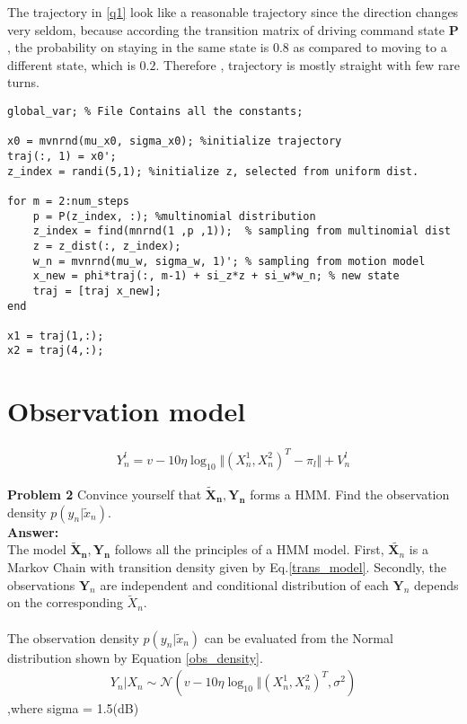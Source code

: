 \documentclass[a4paper]{article}
\begin{document}
The trajectory in \ref{q1} look like a reasonable trajectory since the direction changes very seldom, because according the transition matrix of driving command state $\mathbf{P}$, the probability on staying in the same state is $0.8$ as compared to moving to a different state, which  is $0.2$. Therefore , trajectory is mostly straight with few rare turns.\\

\begin{lstlisting}
global_var; % File Contains all the constants; 

x0 = mvnrnd(mu_x0, sigma_x0); %initialize trajectory
traj(:, 1) = x0'; 
z_index = randi(5,1); %initialize z, selected from uniform dist.

for m = 2:num_steps    
    p = P(z_index, :); %multinomial distribution
    z_index = find(mnrnd(1 ,p ,1));  % sampling from multinomial dist
    z = z_dist(:, z_index); 
    w_n = mvnrnd(mu_w, sigma_w, 1)'; % sampling from motion model 
    x_new = phi*traj(:, m-1) + si_z*z + si_w*w_n; % new state
    traj = [traj x_new];
end

x1 = traj(1,:);
x2 = traj(4,:);

\end{lstlisting}

\section*{Observation model}

\begin{eqnarray}
Y_n^l = v - 10\eta\log_{10} \Vert (X_n^1, X_n^2)^T - \pi_l \Vert + V_n^l
\end{eqnarray} \label{obs_model}

\textbf{Problem 2}
Convince yourself that $\mathbf{\tilde{X}_n, \mathbf{Y}_n}$ forms a HMM. Find the observation density $p(y_n|\tilde{x}_n)$. \\
\textbf{Answer:} \\
The model $\mathbf{\tilde{X}_n, \mathbf{Y}_n}$ follows all the principles of a HMM model. First,  $\tilde{\mathbf{X}_n}$ is a Markov Chain with transition density given by  Eq.\ref{trans_model}. Secondly, the observations $\mathbf{Y}_n$ are independent and conditional distribution of each $\mathbf{Y}_n$ depends on the corresponding $\tilde{X}_n$. \\\\
The observation density $p(y_n|\tilde{x}_n)$ can be evaluated from the Normal distribution shown by Equation \ref{obs_density}.
\begin{eqnarray}
Y_n | X_n \sim \mathcal{N}( v - 10\eta\log_{10} \Vert (X_n^1, X_n^2)^T , \sigma^2)
\end{eqnarray}\label{obs_density}
,where sigma = 1.5(dB)\\
\end{document}
